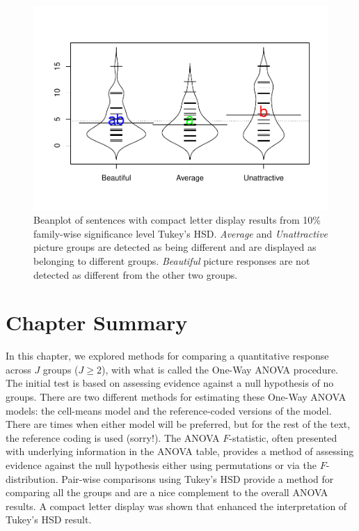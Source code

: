 \documentclass[]{book}
\theoremstyle{definition}
\theoremstyle{definition}
\theoremstyle{remark}
\begin{document}
\begin{figure}
\centering
\includegraphics{03-oneWayAnova_files/figure-latex/Figure3-23-1.pdf}
\caption{\label{fig:Figure3-23}Beanplot of sentences with compact letter display results
from 10\% family-wise significance level Tukey's HSD. \emph{Average} and
\emph{Unattractive} picture groups are detected as being different and
are displayed as belonging to different groups. \emph{Beautiful} picture
responses are not detected as different from the other two groups.}
\end{figure}

\section{Chapter Summary}\label{section3-8}

In this chapter, we explored methods for comparing a quantitative
response across \(J\) groups (\(J \ge 2\)), with what is called the
One-Way ANOVA procedure. The initial test is based on assessing evidence
against a null hypothesis of no groups. There are two different methods
for estimating these One-Way ANOVA models: the cell-means model and the
reference-coded versions of the model. There are times when either model
will be preferred, but for the rest of the text, the reference coding is
used (sorry!). The ANOVA \(F\)-statistic, often presented with
underlying information in the ANOVA table, provides a method of
assessing evidence against the null hypothesis either using permutations
or via the \(F\)-distribution. Pair-wise comparisons using Tukey's HSD
provide a method for comparing all the groups and are a nice complement
to the overall ANOVA results. A compact letter display was shown that
enhanced the interpretation of Tukey's HSD result.
\end{document}
